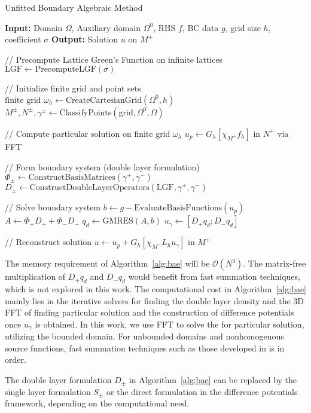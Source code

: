 \begin{algorithm}[t]
\caption{Unfitted Boundary Algebraic Method}\label{alg:bae}
\allowdisplaybreaks
\begin{algorithmic}[1]

    \State \textbf{Input:} Domain $\Omega$, Auxiliary domain $\Omega^0$, RHS $f$, BC data $g$, grid size $h$, coefficient $\sigma$
    \State \textbf{Output:} Solution $u$ on $M^+$

    \Statex

    \State // Precompute Lattice Green's Function on infinite lattices
    \State $\text{LGF} \gets \text{PrecomputeLGF}(\sigma)$ 

    \Statex

    \State // Initialize finite grid and point sets
    \State $\text{finite grid } \omega_h \gets \text{CreateCartesianGrid}(\Omega^0, h)$
    \State $M^\pm, N^\pm, \gamma^\pm \gets \text{ClassifyPoints}(\text{grid}, \Omega^0, \Omega)$
    
    \Statex

    \State // Compute particular solution on finite grid $\omega_h$
    \State $u_p \gets G_h[\chi_{M^+}f_h]$ in $N^+$ via FFT

    \Statex
    
    \State // Form boundary system (double layer formulation)
    \State $\Phi_\pm \gets \text{ConstructBasisMatrices}(\gamma^+, \gamma^-)$ 
    \State $D_\pm \gets \text{ConstructDoubleLayerOperators}(\text{LGF}, \gamma^+, \gamma^-)$ 
    
    \Statex

    \State // Solve boundary system
    \State $b \gets g - \text{EvaluateBasisFunctions}(u_p)$ 
    \State $A \gets \Phi_+D_+ + \Phi_-D_-$ 
    \State $q_d \gets \text{GMRES}(A, b)$  
    \State $u_{\gamma} \gets [D_+q_d; D_-q_d]$ 

    \Statex
    
    \State // Reconstruct solution
    \State $u \gets u_p + G_h[\chi_{M^-}L_hu_\gamma]$ in $M^+$

\end{algorithmic}
\end{algorithm}

The memory requirement of Algorithm~\ref{alg:bae} will be $\mathcal{O}(N^3)$. The matrix-free multiplication of $D_+q_d$ and $D_-q_d$ would benefit from fast summation techniques, which is not explored in this work. The computational cost in Algorithm~\ref{alg:bae} mainly lies in the iterative solvers for finding the double layer density and the 3D FFT of finding particular solution and the construction of difference potentials once $u_\gamma$ is obtained. In this work, we use FFT to solve the for particular solution, utilizing the bounded domain. For unbounded domains and nonhomogenous source functions, fast summation techniques such as those developed in \cite{gillman2014fast} is in order.

\begin{remark}
The double layer formulation $D_{\pm}$ in Algorithm~\ref{alg:bae} can be replaced by the single layer formulation $S_\pm$ or the direct formulation in the difference potentials framework, depending on the computational need.
\end{remark}